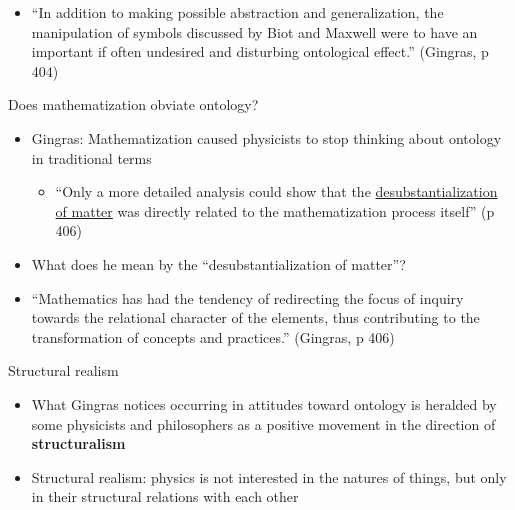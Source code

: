 \documentclass[fleqn]{beamer}
\newcommand{\kw}[1]{\textbf{#1}}
\begin{document}
\begin{frame}

  \begin{itemize}
  \item ``In addition to making possible abstraction and
    generalization, the manipulation of symbols discussed by Biot and
    Maxwell were to have an important if often undesired and
    disturbing ontological effect.'' (Gingras, p 404)
  \end{itemize}

\end{frame}

\begin{frame}{Does mathematization obviate ontology?}

  \begin{itemize}
  \item Gingras: Mathematization caused physicists to stop thinking
    about ontology in traditional terms
    \begin{itemize}
    \item ``Only a more detailed analysis could show that the
      \ul{desubstantialization of matter} was directly related to the
      mathematization process itself'' (p 406)
    \end{itemize}
  \item What does he mean by the ``desubstantialization of matter''?
  \end{itemize}

\end{frame}

\begin{frame}

  \begin{itemize}
  \item ``Mathematics has had the tendency of redirecting the focus of
    inquiry towards the relational character of the elements, thus
    contributing to the transformation of concepts and practices.''
    (Gingras, p 406)
  \end{itemize}

\end{frame}

\begin{frame}{Structural realism}

  \begin{itemize}
  \item What Gingras notices occurring in attitudes toward ontology is
    heralded by some physicists and philosophers as a positive
    movement in the direction of \kw{structuralism}
  \item Structural realism: physics is not interested in the natures
    of things, but only in their structural relations with each other
  \end{itemize}

\end{frame}
\end{document}
